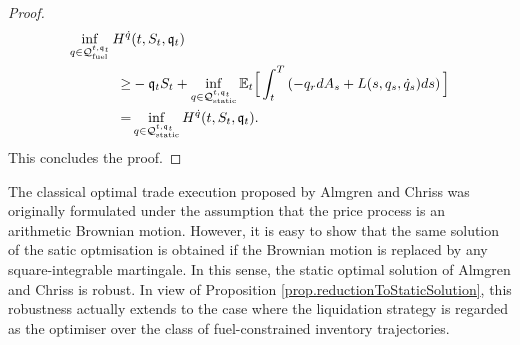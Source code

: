 \documentclass[10pt,a4paper]{article}
\begin{document}
\begin{proof}
\begin{equation*}
\begin{split}
\inf_{q\in \mathcal{Q}_{\text{fuel}}^{t,\mathfrak{q}_t}}
H^{\dot{q}} &(t,S_t,\mathfrak{q}_t)\\
\geq &
-\mathfrak{q}_t S_t
+ \inf_{q \in \mathcal{Q}_{\text{static}}^{t,\mathfrak{q}_t}}
\mathbb{{E}}_t \Big[
\int_{t}^{T} \left(-q_r dA_s + L(s,q_s,\dot{q}_s)ds \right)
\Big]\\
=&
\inf_{q \in \mathcal{Q}_{\text{static}}^{t,\mathfrak{q}_t}}
H^{\dot{q}} (t,S_t,\mathfrak{q}_t).
\end{split}
\end{equation*}
This concludes the proof. 
\end{proof}

\begin{remark}
 The classical optimal trade  execution proposed by Almgren and Chriss \cite{AC00opt} was originally formulated  under the assumption that the price process is an arithmetic Brownian motion. However, it is easy to show that the same solution of the satic optmisation is obtained if the Brownian motion is replaced by any square-integrable martingale. In this sense, the static optimal solution of Almgren and Chriss is robust. In view of Proposition \ref{prop.reductionToStaticSolution}, this robustness actually extends to the case where the liquidation strategy is regarded as the optimiser over  the class of fuel-constrained inventory trajectories.
\end{remark}
\end{document}

